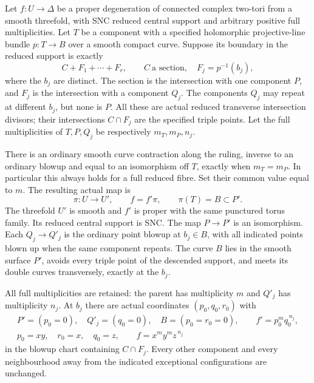 
\begin{proposition}\label{cdp:st:C.2.UN.74}
Let $f:U\to\Delta$ be a proper degeneration of connected
complex two-tori from a smooth threefold, with SNC reduced
central support and arbitrary positive full multiplicities.
Let $T$ be a component with a specified holomorphic
projective-line bundle $p:T\to B$ over a smooth compact
curve. Suppose its boundary in the reduced support is
exactly
\[
           C+F_1+\cdots+F_r,\qquad
           C\ \text{a section},\quad F_j=p^{-1}(b_j),
\tag{C.RC.1}\label{cdp:eq:C.RC.1}
\]
where the $b_j$ are distinct. The section is the
intersection with one component $P$, and $F_j$ is the
intersection with a component $Q_j$. The components
$Q_j$ may repeat at different $b_j$, but none is $P$.
All these are actual reduced transverse intersection
divisors; their intersections $C\cap F_j$ are the
specified triple points. Let the full multiplicities
of $T,P,Q_j$ be respectively $m_T,m_P,n_j$.

There is an ordinary smooth curve contraction along
the ruling, inverse to an ordinary blowup and equal
to an isomorphism off $T$, exactly when
$m_T=m_P$. In particular this always holds for a
full reduced fibre. Set their common value equal
to $m$. The resulting actual map is
\[
              \pi:U\longrightarrow U',\qquad
              f=f'\pi,\qquad \pi(T)=B\subset P'.
\tag{C.RC.2}\label{cdp:eq:C.RC.2}
\]
The threefold $U'$ is smooth and $f'$ is proper with
the same punctured torus family. Its reduced central
support is SNC. The map $P\to P'$ is an isomorphism.
Each $Q_j\to Q'_j$ is the ordinary point blowup at
$b_j\in B$, with all indicated points blown up when
the same component repeats. The curve $B$ lies in
the smooth surface $P'$, avoids every triple point
of the descended support, and meets its double
curves transversely, exactly at the $b_j$.

All full multiplicities are retained: the parent
has multiplicity $m$ and $Q'_j$ has multiplicity
$n_j$. At $b_j$ there are actual coordinates
$(p_0,q_0,r_0)$ with
\[
 \begin{gathered}
 P'=(p_0=0),\quad Q'_j=(q_0=0),\quad
 B=(p_0=r_0=0),\qquad f'=p_0^m q_0^{\,n_j},\\
 p_0=xy,\quad r_0=x,\quad q_0=z,\qquad
                         f=x^m y^m z^{\,n_j}
 \end{gathered}
\tag{C.RC.3}\label{cdp:eq:C.RC.3}
\]
in the blowup chart containing $C\cap F_j$.
Every other component and every neighbourhood away
from the indicated exceptional configurations are
unchanged.


\end{proposition}
